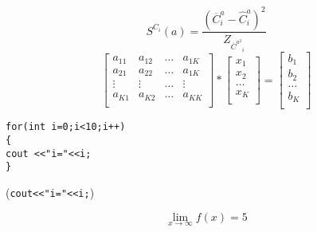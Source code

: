 \documentclass{article}
\begin{document}
\begin{displaymath}
S^{C_{i}}(a)=\frac{(\overline{C}^{a}_{i}-\widehat{C}^{a}_{i})^2}{Z_{{\overline{C}^{a}^2}_{i}}}
\end{displaymath}
\begin{equation}
\left[
\begin{array}{cccc}
a_{11} & a_{12} & \ldots & a_{1K} \\
a_{21} & a_{22} & \ldots & a_{1K} \\
\vdots & \vdots & \ldots & \vdots \\
a_{K1} & a_{K2} & \ldots & a_{KK} \\
\end{array}
\right]*
\left[
\begin{array}{c}
x_1 \\
x_2 \\
\ldots \\
x_K \\
\end{array}
\right] =
\left[
\begin{array}{c}
b_1 \\
b_2 \\
\ldots \\
b_K \\
\end{array}
\right]
\end{equation}
\begin{verbatim}
for(int i=0;i<10;i++)
{
cout <<"i="<<i;
}
\end{verbatim}
\begin{algorithmic}
  \item(\verb+cout<<"i="<<i;+)
\ENDFOR
\end{algorithmic}

\[ \lim_{x \to \infty} f(x) = 5 \]
\end{document}
